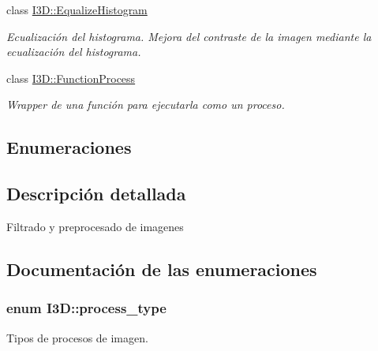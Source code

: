 \begin{DoxyCompactItemize}
class \hyperlink{class_i3_d_1_1_equalize_histogram}{I3\+D\+::\+Equalize\+Histogram}
\begin{DoxyCompactList}\small\item\em Ecualización del histograma. Mejora del contraste de la imagen mediante la ecualización del histograma. \end{DoxyCompactList}\item 
class \hyperlink{class_i3_d_1_1_function_process}{I3\+D\+::\+Function\+Process}
\begin{DoxyCompactList}\small\item\em Wrapper de una función para ejecutarla como un proceso. \end{DoxyCompactList}\end{DoxyCompactItemize}
\subsection*{Enumeraciones}


\subsection{Descripción detallada}
Filtrado y preprocesado de imagenes 

\subsection{Documentación de las enumeraciones}
\subsubsection[{\texorpdfstring{process\+\_\+type}{process_type}}]{\setlength{\rightskip}{0pt plus 5cm}enum {\bf I3\+D\+::process\+\_\+type}\hspace{0.3cm}{\ttfamily [strong]}}\hypertarget{group___img_proc_gaa7be5aaaa0e9ec5885c5bd72f41dad47}{}\label{group___img_proc_gaa7be5aaaa0e9ec5885c5bd72f41dad47}


Tipos de procesos de imagen. 

